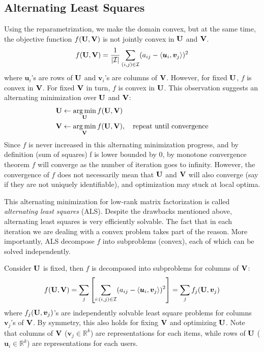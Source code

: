 \documentclass[../main.tex]{subfiles}
\begin{document}
\subsection{Alternating Least Squares}
Using the reparametrization, we make the domain convex, but at the same time, the objective function $f({\bf U}, {\bf V})$ is not jointly convex in ${\bf U}$ and ${\bf V}$. 
\begin{equation*}
f({\bf U}, {\bf V})=\frac{1}{|\mathcal{I}|}\sum_{(i,j)\in \mathcal{I}}(a_{ij}-\langle\bm{u}_i,\bm{v}_j\rangle)^2
\end{equation*}
where $\bm{u}_i$'s are rows of ${\bf U}$ and $\bm{v}_i$'s are columns of ${\bf V}$. However, for fixed ${\bf U}$, $f$ is convex in ${\bf V}$. For fixed ${\bf V}$ in turn, $f$ is convex in ${\bf U}$. This observation suggests an alternating minimization over ${\bf U}$ and ${\bf V}$:
\begin{align*}
&{\bf U}\leftarrow \mathop{\arg\min}_{{\bf U}} f({\bf U}, {\bf V})\\
&{\bf V}\leftarrow \mathop{\arg\min}_{{\bf V}} f({\bf U}, {\bf V}),\quad \text{repeat until convergence}
\end{align*}
Since $f$ is never increased in this alternating minimization progress, and by definition (sum of squares) f is lower bounded by $0$, by monotone convergence theorem $f$ will converge as the number of iteration goes to infinity. However, the convergence of $f$ does not necessarily mean that ${\bf U}$ and ${\bf V}$ will also converge (say if they are not uniquely identifiable), and optimization may stuck at local optima.
\par This alternating minimization for low-rank matrix factorization is called \emph{alternating least squares} (ALS). Despite the drawbacks mentioned above, alternating least squares is very efficiently solvable. The fact that in each iteration we are dealing with a convex problem takes part of the reason. More importantly, ALS decompose $f$ into subproblems (convex), each of which can be solved independently. 
\par Consider ${\bf U}$ is fixed, then $f$ is decomposed into subproblems for columns of ${\bf V}$:
\begin{equation*}
f({\bf U}, {\bf V})= \sum_{j}\left[\sum_{i:(i,j)\in \mathcal{I}} (a_{ij} - \langle \bm{u}_i,\bm{v}_j \rangle)^2\right] = \sum_{j} f_j({\bf U}, \bm{v}_j)
\end{equation*}
where $f_j({\bf U}, \bm{v}_j)$'s are independently solvable least square problems for columns $\bm{v}_j$'s of ${\bf V}$. By symmetry, this also holds for fixing ${\bf V}$ and optimizing ${\bf U}$. Note that columns of ${\bf V}$ ($\bm{v}_j \in \mathbb{R}^k$) are representations for each items, while rows of ${\bf U}$ ($\bm{u}_i \in \mathbb{R}^k$) are representations for each users. 
\end{document}
